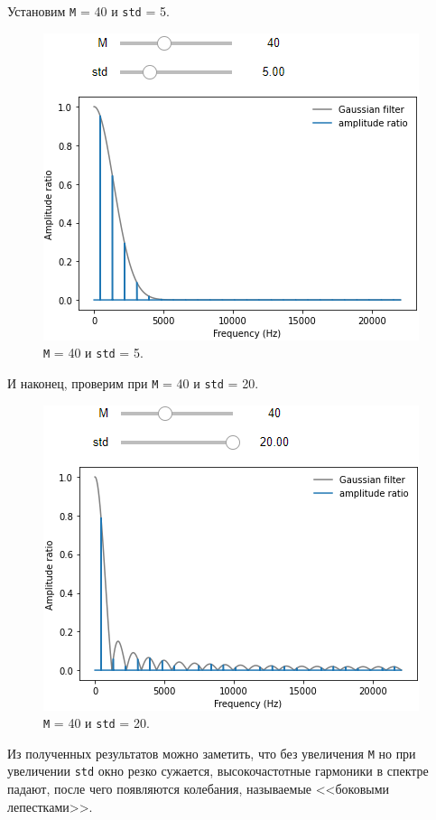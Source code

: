 \documentclass[a4paper, 14pt]{extarticle}
\begin{document}
    Установим \texttt{M} = 40 и \texttt{std} = 5.

    \begin{figure}[h]
        \centering
        \includegraphics[width=0.75\linewidth]{resources/Images/task1_check_m40_std5}
        \caption{\texttt{M} = 40 и \texttt{std} = 5.}
        \label{fig:task1_check_m40_std5}
    \end{figure}

    И наконец, проверим при \texttt{M} = 40 и \texttt{std} = 20.

    \begin{figure}[h]
        \centering
        \includegraphics[width=0.8\linewidth]{resources/Images/task1_check_m40_std20}
        \caption{\texttt{M} = 40 и \texttt{std} = 20.}
        \label{fig:task1_check_m40_std20}
    \end{figure}

    Из полученных результатов можно заметить, что без увеличения \texttt{M} но при увеличении \texttt{std} окно
    резко сужается, высокочастотные гармоники в спектре падают, после чего появляются колебания, называемые
    <<боковыми лепестками>>.
\end{document}
